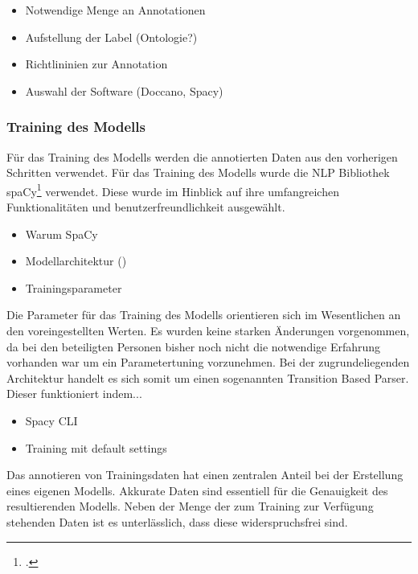
\begin{itemize}
    \item Notwendige Menge an Annotationen
    \item Aufstellung der Label (Ontologie?)
    \item Richtlininien zur Annotation
    \item Auswahl der Software (Doccano, Spacy)
\end{itemize}
\subsubsection{Training des Modells}
Für das Training des Modells werden die annotierten Daten aus den vorherigen Schritten verwendet.
Für das Training des Modells wurde die \acl*{NLP} Bibliothek spaCy\footcite[]{spacy2} verwendet. Diese wurde im Hinblick auf ihre umfangreichen Funktionalitäten und benutzerfreundlichkeit ausgewählt.

\begin{itemize}
    \item Warum SpaCy
    \item Modellarchitektur ()
    \item Trainingsparameter
\end{itemize}

Die Parameter für das Training des Modells orientieren sich im Wesentlichen an den voreingestellten Werten. Es wurden keine starken Änderungen vorgenommen, da bei den beteiligten Personen bisher noch nicht die notwendige Erfahrung vorhanden war um ein Parametertuning vorzunehmen.
Bei der zugrundeliegenden Architektur handelt es sich somit um einen sogenannten Transition Based Parser. Dieser funktioniert indem...
\begin{itemize}
    \item Spacy CLI
    \item Training mit default settings
\end{itemize}
Das annotieren von Trainingsdaten hat einen zentralen Anteil bei der Erstellung eines eigenen Modells. Akkurate Daten sind essentiell für die Genauigkeit des resultierenden Modells. Neben der Menge der zum Training zur Verfügung stehenden Daten ist es unterlässlich, dass diese widerspruchsfrei sind.

